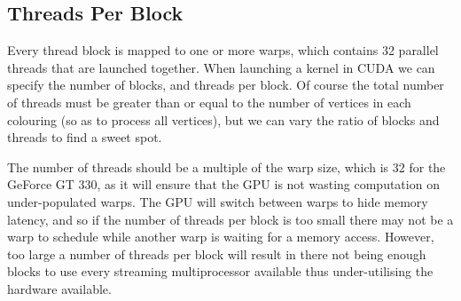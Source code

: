 \subsection{Threads Per Block}
Every thread block is mapped to one or more warps, which contains 32 parallel threads that are launched together. When launching a kernel in CUDA we can specify the number of blocks, and threads per block. Of course the total number of threads must be greater than or equal to the number of vertices in each colouring (so as to process all vertices), but we can vary the ratio of blocks and threads to find a sweet spot.

The number of threads should be a multiple of the warp size, which is 32 for the GeForce GT 330, as it will ensure that the GPU is not wasting computation on under-populated warps. The GPU will switch between warps to hide memory latency\cite{threads_atomics}, and so if the number of threads per block is too small there may not be a warp to schedule while another warp is waiting for a memory access. However, too large a number of threads per block will result in there not being enough blocks to use every streaming multiprocessor available thus under-utilising the hardware available.